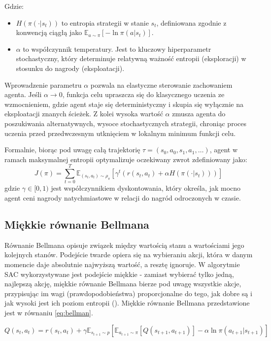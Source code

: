\documentclass[12pt,twoside]{article}
\begin{document}
Gdzie:
\begin{itemize}
    \item $H(\pi(\cdot | s_t))$ to entropia strategii w stanie $s_t$, definiowana zgodnie z konwencją ciągłą jako $\mathbb{E}_{a \sim \pi} [-\ln \pi(a | s_t)]$.
    \item $\alpha$ to współczynnik temperatury. Jest to kluczowy hiperparametr stochastyczny, który determinuje relatywną ważność entropii (eksploracji) w stosunku do nagrody (eksploatacji).
\end{itemize}

Wprowadzenie parametru $\alpha$ pozwala na elastyczne sterowanie zachowaniem agenta. Jeśli $\alpha \to 0$, funkcja celu upraszcza się do klasycznego uczenia ze wzmocnieniem, gdzie agent staje się deterministyczny i skupia się wyłącznie na eksploatacji znanych ścieżek. Z kolei wysoka wartość $\alpha$ zmusza agenta do poszukiwania alternatywnych, wysoce stochastycznych strategii, chroniąc proces uczenia przed przedwczesnym utknięciem w lokalnym minimum funkcji celu.

Formalnie, biorąc pod uwagę całą trajektorię $\tau = (s_0, a_0, s_1, a_1, \dots)$, agent w ramach maksymalnej entropii optymalizuje oczekiwany zwrot zdefiniowany jako:
\begin{equation}
J(\pi) = \sum_{t=0}^{T} \mathbb{E}_{(s_t, a_t) \sim \rho_{\pi}} \left[ \gamma^t \left( r(s_t, a_t) + \alpha H(\pi(\cdot | s_t)) \right) \right]
\label{eq:sac_oczekiwany_zwrot}
\end{equation}
gdzie $\gamma \in [0, 1)$ jest współczynnikiem dyskontowania, który określa, jak mocno agent ceni nagrody natychmiastowe w relacji do nagród odroczonych w czasie.

\subsection{Miękkie równanie Bellmana}
Równanie Bellmana opisuje związek między wartością stanu a wartościami jego kolejnych stanów. Podejście twarde opiera się na wybieraniu akcji, która w danym momencie daje absolutnie najwyższą wartość, a resztę ignoruje. W algorytmie SAC wykorzystywane jest podejście miękkie - zamiast wybierać tylko jedną, najlepszą akcję, miękkie równanie Bellmana bierze pod uwagę wszystkie akcje, przypisując im wagi (prawdopodobieństwa) proporcjonalne do tego, jak dobre są i jak wysoki jest ich poziom entropii (\cite{str10}). Miękkie równanie Bellmana przedstawione jest w równaniu \ref{eq:bellman}.

\begin{equation}
Q(s_t, a_t) = r(s_t, a_t) + \gamma \mathbb{E}_{s_{t+1} \sim p} \left[ \mathbb{E}_{a_{t+1} \sim \pi} [Q(s_{t+1}, a_{t+1})] - \alpha \ln \pi(a_{t+1}|s_{t+1}) \right]
\label{eq:bellman}
\end{equation}
\end{document}
